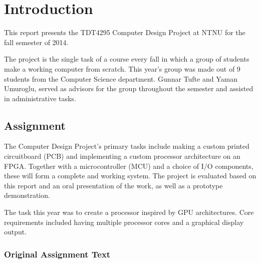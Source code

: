 \documentclass[../main/report.tex]{subfiles}
\begin{document}
\chapter{Introduction}
\label{sec:intro}

This report presents the TDT4295 Computer Design Project at NTNU for the fall semester of 2014.

The project is the single task of a course every fall in which a group of students make a working computer from scratch.
This year's group was made out of 9 students from the Computer Science department.
Gunnar Tufte and Yaman Umuroglu, served as advisors for the group throughout the semester and assisted in administrative tasks.

\section{Assignment}

The Computer Design Project's primary tasks include making a custom printed circuitboard (PCB) and  implementing a custom processor architecture on an FPGA.
Together with a microcontroller (MCU) and a choice of I/O components, these will form a complete and working system.
The project is evaluated based on this report and an oral presentation of the work, as well as a prototype demonstration.

The task this year was to create a processor inspired by GPU architectures.
Core requirements included having multiple processor cores and a graphical display output.

\newpage

\subsection{Original Assignment Text}

\vspace{1cm}
\noindent
\end{document}
